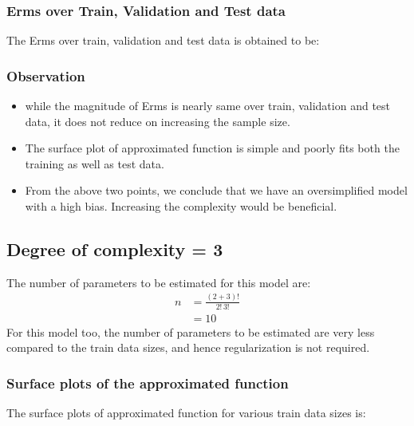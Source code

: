 \documentclass[12pt,a4paper]{article}
\newcommand{\noi}{\noindent}
\begin{document}
\noi

\subsubsection{Erms over Train, Validation and Test data}
The Erms over train, validation and test data is obtained to be: 


\noi
\subsubsection{Observation}
\begin{itemize}
    \item while the magnitude of Erms is nearly same over train, validation and test data, it does not reduce on increasing the sample size. 
    \item The surface plot of approximated function is simple and poorly fits both the training as well as test data.
    \item From the above two points, we conclude that we have an oversimplified model with a high bias. Increasing the complexity would be beneficial.
\end{itemize}

\subsection{Degree of complexity = 3}
The number of parameters to be estimated for this model are: 
\begin{equation}
    \begin{split}
        n&=\frac{(2+3)!}{2!\,3!} \\
         &=10
    \end{split}
\end{equation}
\noi
For this model too, the number of parameters to be estimated are very less compared to the train data sizes, and hence regularization is not required. 

\subsubsection{Surface plots of the approximated function}
The surface plots of approximated function for various train data sizes is: 
\end{document}
